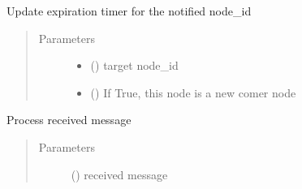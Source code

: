 \documentclass[letterpaper,10pt,english]{sphinxmanual}
\begin{document}
\begin{fulllineitems}

\begin{fulllineitems}
\label{\detokenize{bbc1.core.topology_manager:bbc1.core.topology_manager.TopologyManagerBase.notify_neighbor_update}}
Update expiration timer for the notified node\_id
\begin{quote}\begin{description}
\item[{Parameters}] \leavevmode\begin{itemize}
\item {} 
 () \textendash{} target node\_id

\item {} 
 () \textendash{} If True, this node is a new comer node

\end{itemize}

\end{description}\end{quote}

\end{fulllineitems}


\begin{fulllineitems}
\label{\detokenize{bbc1.core.topology_manager:bbc1.core.topology_manager.TopologyManagerBase.process_message}}
Process received message
\begin{quote}\begin{description}
\item[{Parameters}] \leavevmode
{} () \textendash{} received message

\end{description}\end{quote}

\end{fulllineitems}



\end{fulllineitems}
\end{document}
